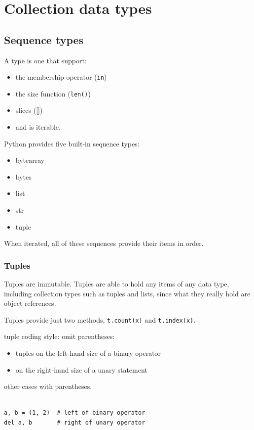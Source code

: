 
\chapter{Collection data types}

\section{Sequence types}

\begin{tcolorbox}
  A  type is one that support:
  \begin{itemize}
  \item the membership operator (\verb|in|)
  \item the size function (\verb|len()|) 
  \item slices ([]) 
  \item and is iterable.
  \end{itemize}
  Python provides five built-in sequence types:
  \begin{itemize}
  \item bytearray
  \item bytes
  \item list
  \item str
  \item tuple
  \end{itemize}
  When iterated, all of these sequences provide their items in order.
\end{tcolorbox}



\subsection{Tuples}

Tuples are immutable.
Tuples are able to hold any items of any data type, including collection types such as tuples and lists, since what they really hold are object references.

Tuples provide just two methods, \verb|t.count(x)| and \verb|t.index(x)|.

\begin{tcolorbox}
  tuple coding style:
  omit parentheses:
  \begin{itemize}
  \item tuples on the left-hand size of a binary operator
  \item on the right-hand size of a unary statement
  \end{itemize}
  other cases with parentheses.

  \begin{lstlisting}

a, b = (1, 2)  # left of binary operator
del a, b       # right of unary operator
  \end{lstlisting}

\end{tcolorbox}


